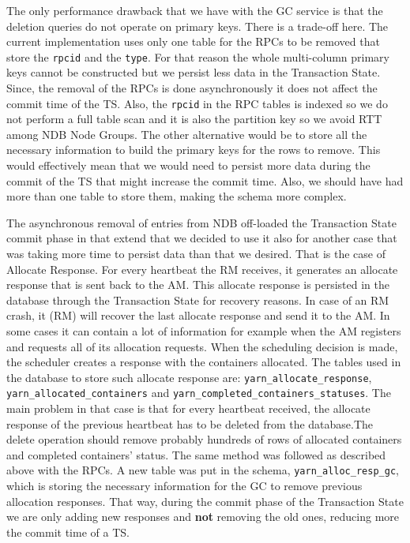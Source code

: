 The only performance drawback that we have with the GC service is that
the deletion queries do not operate on primary keys. There is a
trade-off here. The current implementation uses only one table for the
RPCs to be removed that store the \texttt{rpcid} and the
\texttt{type}. For that reason the whole multi-column primary keys
cannot be constructed but
we persist less data in the Transaction State. Since, the removal of
the RPCs is done asynchronously it does not affect the commit time
of the TS. Also, the \texttt{rpcid} in the RPC tables is indexed so we
do not perform a full table scan and it is also the partition key so we avoid RTT
among NDB Node Groups. The other alternative would be to
store all the necessary information to build the primary keys for the
rows to remove. This would effectively mean that we would need to persist more
data during the commit of the TS that might increase the commit
time. Also, we should have had more than one table to store them,
making the schema more complex.

The asynchronous removal of entries from NDB off-loaded the Transaction
State commit phase in that extend that we decided to use it also for
another case that was taking more time to persist data than that we
desired. That is the case of Allocate Response. For every heartbeat
the RM receives, it generates an allocate response that is sent back to the
AM. This allocate response is persisted in the database through the
Transaction State for recovery reasons. In case of an RM crash, it (RM) will
recover the last allocate response and send it to the AM. In some cases it can contain a
lot of information for example when the AM registers and requests all
of its allocation requests. When the scheduling decision is made,
the scheduler creates a response with the
containers allocated. The tables used in the database to store such
allocate response are: \texttt{yarn\_allocate\_response},
\texttt{yarn\_allocated\_containers} and
\texttt{yarn\_completed\_containers\_statuses}. The main problem in
that case is that for every heartbeat received, the allocate response
of the previous heartbeat has to be deleted from the database.The
delete operation should remove probably hundreds of
rows of allocated containers and completed containers' status. The
same method was followed as described above with the RPCs. A new table
was put in the schema, \texttt{yarn\_alloc\_resp\_gc}, which is
storing the necessary information for the GC to remove previous
allocation responses. That way, during the commit phase of the
Transaction State we are only adding new responses and \textbf{not} removing
the old ones, reducing more the commit time of a TS.

